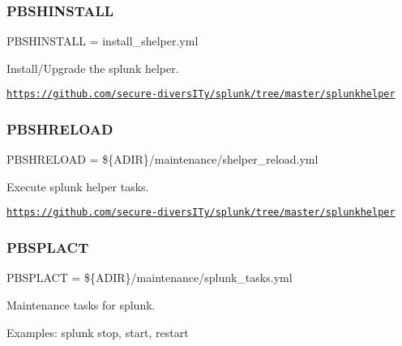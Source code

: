 \subsubsection{\texorpdfstring{P\+B\+S\+H\+I\+N\+S\+T\+A\+LL}{PBSHINSTALL}}
{\footnotesize\ttfamily P\+B\+S\+H\+I\+N\+S\+T\+A\+LL = install\+\_\+shelper.\+yml}



Install/\+Upgrade the splunk helper. 

\href{https://github.com/secure-diversITy/splunk/tree/master/splunkhelper}{\tt https\+://github.\+com/secure-\/divers\+I\+Ty/splunk/tree/master/splunkhelper} \mbox{\label{ansible__engine_8sh_a5abc6709ccffb498c492099b1770c0d6}} 
\subsubsection{\texorpdfstring{P\+B\+S\+H\+R\+E\+L\+O\+AD}{PBSHRELOAD}}
{\footnotesize\ttfamily P\+B\+S\+H\+R\+E\+L\+O\+AD = \$\{A\+D\+IR\}/maintenance/shelper\+\_\+reload.\+yml}



Execute splunk helper tasks. 

\href{https://github.com/secure-diversITy/splunk/tree/master/splunkhelper}{\tt https\+://github.\+com/secure-\/divers\+I\+Ty/splunk/tree/master/splunkhelper} \mbox{\label{ansible__engine_8sh_a07a65ca55f4f8bec6ba69c3d4f05db1c}} 
\subsubsection{\texorpdfstring{P\+B\+S\+P\+L\+A\+CT}{PBSPLACT}}
{\footnotesize\ttfamily P\+B\+S\+P\+L\+A\+CT = \$\{A\+D\+IR\}/maintenance/splunk\+\_\+tasks.\+yml}



Maintenance tasks for splunk. 

Examples\+: splunk stop, start, restart \mbox{\label{ansible__engine_8sh_af6d5a9916e4dc573ceb5dcc099e131a3}} 
